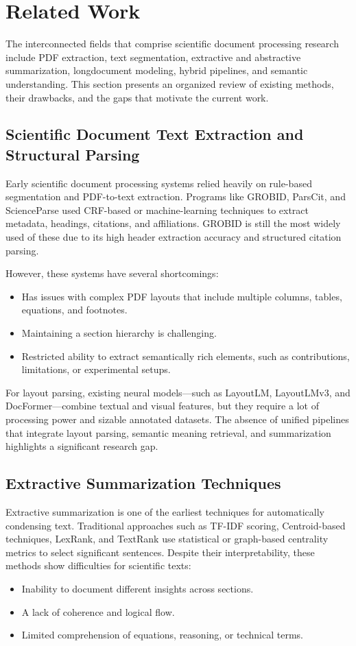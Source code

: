 \documentclass[conference]{IEEEtran}
\begin{document}
\section{Related Work}

The interconnected fields that comprise scientific document processing research include PDF extraction, text segmentation, extractive and abstractive summarization, longdocument modeling, hybrid pipelines, and semantic understanding. This section presents an organized review of existing methods, their drawbacks, and the gaps that motivate the current work.

\subsection{Scientific Document Text Extraction and Structural Parsing}
Early scientific document processing systems relied heavily on rule-based segmentation and PDF-to-text extraction. Programs like GROBID, ParsCit, and ScienceParse used CRF-based or machine-learning techniques to extract metadata, headings, citations, and affiliations. GROBID is still the most widely used of these due to its high header extraction accuracy and structured citation parsing.

However, these systems have several shortcomings:
\begin{itemize}
    \item Has issues with complex PDF layouts that include multiple columns, tables, equations, and footnotes.
    \item Maintaining a section hierarchy is challenging.
    \item Restricted ability to extract semantically rich elements, such as contributions, limitations, or experimental setups.
\end{itemize}

For layout parsing, existing neural models—such as LayoutLM, LayoutLMv3, and DocFormer—combine textual and visual features, but they require a lot of processing power and sizable annotated datasets. The absence of unified pipelines that integrate layout parsing, semantic meaning retrieval, and summarization highlights a significant research gap.

\subsection{Extractive Summarization Techniques}
Extractive summarization is one of the earliest techniques for automatically condensing text. 
Traditional approaches such as TF-IDF scoring, Centroid-based techniques, LexRank, and TextRank use statistical or graph-based centrality metrics to select significant sentences. Despite their interpretability, these methods show difficulties for scientific texts:
\begin{itemize}
    \item Inability to document different insights across sections.
    \item A lack of coherence and logical flow.
    \item Limited comprehension of equations, reasoning, or technical terms.
\end{itemize}
\end{document}
